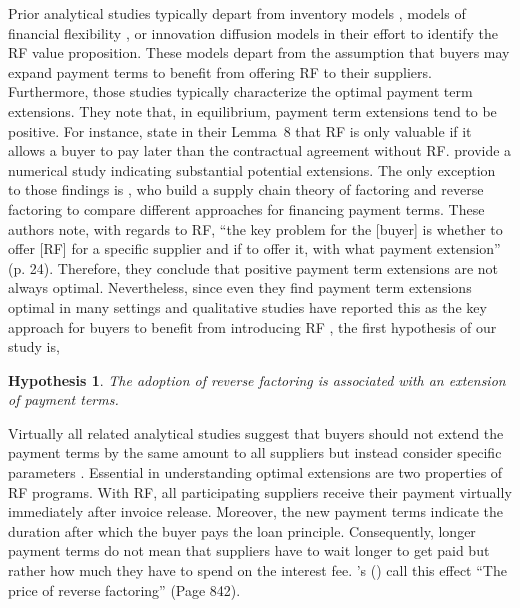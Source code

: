 \documentclass[A4,11pt]{article}
\newcommand{\cites}[1]{\citeauthor{#1}'s (\citeyear{#1})}
\renewcommand{\~}[1]{\tilde{#1}}
\renewcommand{\-}[1]{\overline{#1}}
\newtheorem{hypothesis}{Hypothesis}
\begin{document}
Prior analytical studies typically depart from inventory models \citep{Lekkakos2016,Kouvelis2020,Tanrisever2012,vanderVliet2015}, models of financial flexibility \citep{Grueter2017,Hu2018}, or innovation diffusion models \citep{DelloIacono2015, Wuttke2016} in their effort to identify the RF value proposition. These models depart from the assumption that buyers may expand payment terms to benefit from offering RF to their suppliers. Furthermore, those studies typically characterize the optimal payment term extensions. They note that, in equilibrium, payment term extensions tend to be positive. For instance, \citet{Hu2018} state in their Lemma~8 that RF is only valuable if it allows a buyer to pay later than the contractual agreement without RF. \citet{Lekkakos2016} provide a numerical study indicating substantial potential extensions. The only exception to those findings is \citet{Kouvelis2020}, who build a supply chain theory of factoring and reverse factoring to compare different approaches for financing payment terms. These authors note, with regards to RF, ``the key problem for the [buyer] is whether to offer [RF] for a specific supplier and if to offer it, with what payment extension'' (p. 24). Therefore, they conclude that positive payment term extensions are not always optimal. Nevertheless, since even they find payment term extensions optimal in many settings and qualitative studies have reported this as the key approach for buyers to benefit from introducing RF \citep{Liebl2016, Wuttke2013}, the first hypothesis of our study is,

\begin{hypothesis}\label{H:expand}
The adoption of reverse factoring is associated with an extension of payment terms.
\end{hypothesis}

Virtually all related analytical studies suggest that buyers should not extend the payment terms by the same amount to all suppliers but instead consider specific parameters \citep{Grueter2017, Hu2018, Kouvelis2020, Lekkakos2016, Tanrisever2012, vanderVliet2015, Wuttke2016}. Essential in understanding optimal extensions are two properties of RF programs. With RF, all participating suppliers receive their payment virtually immediately after invoice release. Moreover, the new payment terms indicate the duration after which the buyer pays the loan principle. Consequently, longer payment terms do not mean that suppliers have to wait longer to get paid but rather how much they have to spend on the interest fee. \cites{vanderVliet2015} call this effect ``The price of reverse factoring'' (Page 842). 
\end{document}
